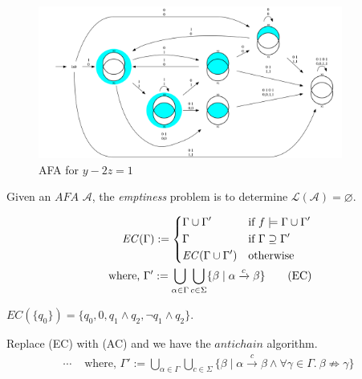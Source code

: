 \begin{example}
\begin{figure}
  \end{figure}
  \begin{figure}
    \caption{AFA for \( y -2z = 1 \)}
    \includegraphics[width=10cm]{images/afa_odd_x.png}
  \end{figure}
\end{example}

\iffalse
Given an \( \mathit{AFA}\) \( \mathcal{A} \), the \textit{emptiness} problem is
to determine \( \mathcal{L}(\mathcal{A}) = \varnothing \).

\begin{definition}
  \begin{align*}
    \mathit{EC}(\Gamma) :=
    \begin{dcases}
    \Gamma \cup \Gamma'              &\text{if } f \models \Gamma \cup \Gamma'
    \\
    \Gamma                           &\text{if } \Gamma \supseteq \Gamma'
    \\
    \mathit{EC}(\Gamma \cup \Gamma') &\text{otherwise } 
    \end{dcases}
    \\
    \text{ where, } \Gamma' :=
    \bigcup\limits_{\alpha \in \Gamma}
    \bigcup\limits_{c \in \Sigma}
    \{ \beta \mid \alpha \xrightarrow[]c \beta \}
    \tag{EC}
  \end{align*}
\end{definition}

\begin{example}
\( \mathit{EC}(\{ q_0 \}) = \{ q_0, 0, q_1 \wedge q_2, \neg q_1 \wedge q_2 \} \).
\end{example}

\begin{definition}
Replace (EC) with (AC) and we have the \( \mathit{antichain} \) algorithm. 
    \begin{align*} \cdots & \text{ where, } \Gamma' :=
    \bigcup\limits_{\alpha \in \Gamma}
    \bigcup\limits_{c \in \Sigma}
    \{
    \beta \mid \alpha \xrightarrow[]c \beta
    \wedge
    \forall \gamma \in \Gamma .\ \beta \not \Rightarrow \gamma
    \}
    \tag{AC}
    \end{align*}
\end{definition}

